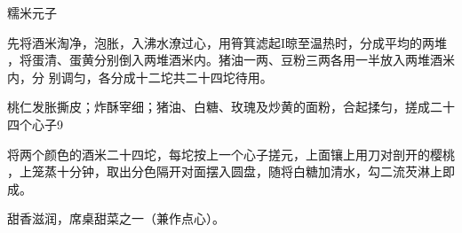 \begin{recipe}[原珍珠元子]{糯米元子}

\ingredients


\cooking

\step 先将酒米淘净，泡胀，入沸水潦过心，用筲箕滤起I晾至温热时，分成平均的两堆
，将蛋清、蛋黄分别倒入两堆酒米内。猪油一两、豆粉三两各用一半放入两堆酒米内，分
别调匀，各分成十二坨共二十四坨待用。

\step 桃仁发胀撕皮；炸酥宰细；猪油、白糖、玫瑰及炒黄的面粉，合起揉匀，搓成二十
四个心子9

\step 将两个颜色的酒米二十四坨，每坨按上一个心子搓元，上面镶上用刀对剖开的樱桃
，上笼蒸十分钟，取出分色隔开对面摆入圆盘，随将白糖加清水，勾二流芡淋上即成。

\notes

甜香滋润，席桌甜菜之一（兼作点心）。

\end{recipe}

